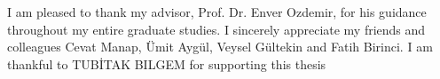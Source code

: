 I am pleased to thank my advisor, Prof. Dr. Enver Ozdemir, for his guidance throughout my entire graduate studies. I sincerely appreciate my friends and colleagues Cevat Manap, Ümit Aygül, Veysel Gültekin and Fatih Birinci. I am thankful to TUBİTAK BILGEM for supporting this thesis